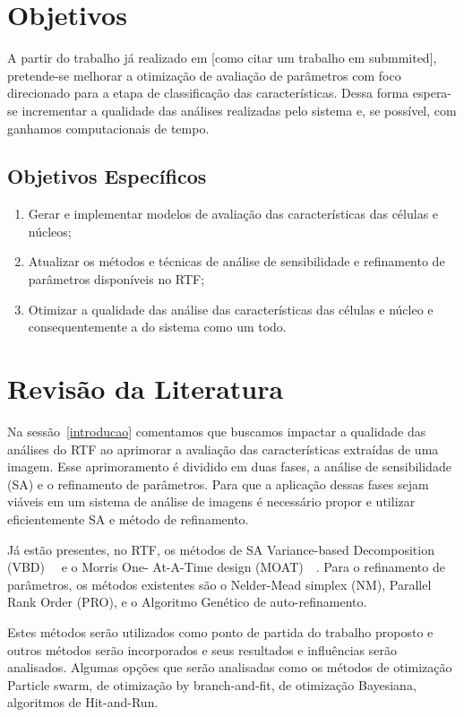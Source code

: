 \documentclass[a4paper,10pt]{article}
\begin{document}
\section{Objetivos}

A partir do trabalho já realizado em [como citar um trabalho em submmited], pretende-se melhorar a otimização de avaliação de parâmetros com foco direcionado para a etapa de classificação das características. Dessa forma espera-se incrementar a qualidade das análises realizadas pelo sistema e, se possível, com ganhamos computacionais de tempo.


\subsection{Objetivos Específicos}

\begin{enumerate}
	\item  Gerar e implementar modelos de avaliação das características das células e núcleos;
\item  Atualizar os métodos e técnicas de análise de sensibilidade e refinamento de parâmetros disponíveis no RTF;
\item Otimizar a qualidade das análise das características das células e núcleo e consequentemente a do sistema como um todo.
\end{enumerate}


\section{Revisão da Literatura}

Na sessão~\ref{introducao} comentamos que buscamos impactar a qualidade das análises do RTF ao aprimorar a avaliação das características extraídas de uma imagem. Esse aprimoramento é dividido em duas fases, a análise de sensibilidade (SA) e o refinamento de parâmetros. Para que a aplicação dessas fases sejam viáveis em um sistema de análise de imagens é necessário propor e utilizar eficientemente SA e método de refinamento.

Já estão presentes, no RTF, os métodos de SA Variance-based Decomposition (VBD)~\cite{weirs2012sensitivity}~\cite{sobol2001global}  e o Morris One- At-A-Time design (MOAT)~\cite{morris1991factorial}~\cite{campolongo2007effective}. Para o refinamento de parâmetros, os métodos existentes são o Nelder-Mead simplex (NM), Parallel Rank Order (PRO), e o Algoritmo Genético de auto-refinamento. 

Estes métodos serão utilizados como ponto de partida do trabalho proposto e outros métodos serão incorporados e seus resultados e influências serão analisados. Algumas opções que serão analisadas como os métodos de otimização Particle swarm, de otimização by branch-and-fit, de otimização Bayesiana, algoritmos de Hit-and-Run.
\end{document}
